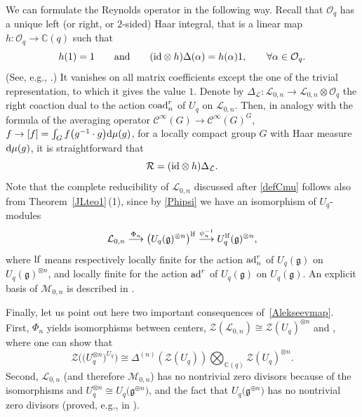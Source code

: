 \documentclass[pdftex]{sigma}
\numberwithin{equation}{section}
\theoremstyle{definition}
\newcommand{\mc}{\mathbb{C}}
\newcommand{\Ll}{{\mathcal L}}
\newcommand{\Mm}{{\mathcal M}}
\newcommand{\Oo}{{\mathcal O}}
\newcommand{\Rr}{{\mathcal R}}
\newcommand{\ra}{\rightarrow}
\begin{document}
We can formulate the Reynolds operator in the following way. Recall that $\Oo_q$ has a unique left (or right, or $2$-sided) Haar integral, that is a linear map $h\colon \Oo_q\ra \mc(q)$ such that
\[%
h(1)=1 \qquad \text{and}\qquad ({\rm id}\otimes h)\Delta(\alpha) = h(\alpha)1,\qquad \forall \alpha\in \Oo_q.
\]
(See, e.g., \cite[Proposition 13.3.6]{CP}.) It vanishes on all matrix coefficients except the one of the trivial representation, to which it gives the value $1$. Denote by $\Delta_\Ll\colon {\mathcal L}_{0,n} \ra {\mathcal L}_{0,n}\otimes \Oo_q$ the right coaction dual to the action ${\rm coad}_n^r$ of $U_q$ on ${\mathcal L}_{0,n}$. Then, in analogy with the formula of the averaging operator $\mathcal{C}^\infty(G) \ra \mathcal{C}^\infty(G)^G$, $f\ra [f] = \int_G f\big(g^{-1} \cdot g\big) {\rm d}\mu(g)$, for a locally compact group $G$ with Haar measure ${\rm d}\mu(g)$, it is straightforward that
\begin{equation}\label{formuleRh}
\Rr = ({\rm id}\otimes h)\Delta_\Ll .
\end{equation}
Note that the complete reducibility of $\Ll_{0,n}$ discussed after \eqref{defCmu} follows also from Theorem~\ref{JLteo1}\,(1), since by \eqref{Phipsi} we have an isomorphism of $U_q$-modules
\[%
{\mathcal L}_{0,n} \stackrel{\Phi_n}{\longrightarrow} \big(U_q({\mathfrak g})^{\otimes n}\big)^{\rm lf} \stackrel{\psi_n^{-1}}{\longrightarrow}U_q^{\rm lf}({\mathfrak g})^{\otimes n},
\]
where ${\rm lf}$ means respectively locally finite for the action ${\rm ad}_n^r$ of $U_q({\mathfrak g})$ on $U_q({\mathfrak g})^{\otimes n}$, and locally finite for the action ${\rm ad}^r$ of $U_q({\mathfrak g})$ on $U_q({\mathfrak g})$. An explicit basis of $\Mm_{0,n}$ is described in \cite[Pro\-po\-sition~6.22]{BR}.

Finally, let us point out here two important consequences of~\eqref{Alekseevmap}. First, $\Phi_n$ yields isomorphisms between centers, $\mathcal{Z}(\Ll_{0,n}) \cong \mathcal{Z}(U_q)^{\otimes n}$ and \smash{$\mathcal{Z}\big(\Ll_{0,n}^{U_q}\big) \cong \mathcal{Z}\big(\big(U_{q}^{\otimes n}\big)^{U_q}\big)$}, where one can show that \cite[Lemma 6.29]{BR}
\begin{equation}\label{Zinv}
\mathcal{Z}\big(\big(U_{q}^{\otimes n}\big)^{U_q}\big)\cong \Delta^{(n)}(\mathcal{Z}(U_q))\bigotimes_{{\mathbb C}(q)}\mathcal{Z}(U_q)^{\otimes n}.
\end{equation}
Second, $\Ll_{0,n}$ (and therefore $\Mm_{0,n}$) has no nontrivial zero divisors because of the isomorphisms \smash{$\Phi_n\colon \Ll_{0,n} \ra \big(U_q^{\otimes n}\big)^{\rm lf}\subset U_q^{\otimes n}$} and $U_q^{\otimes n}\cong U_q\big(\mathfrak{g}^{\oplus n}\big)$, and the fact that $U_q\big(\mathfrak{g}^{\oplus n}\big)$ has no nontrivial zero divisors (proved, e.g., in \cite{DC-K}).
\end{document}
